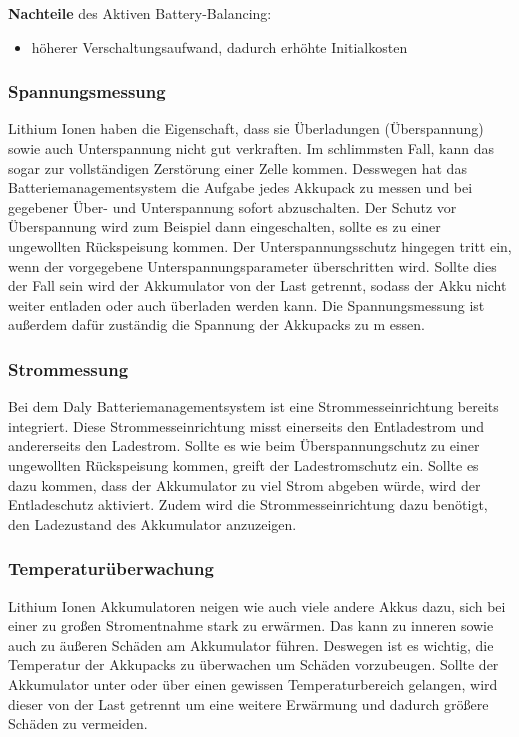 \textbf{Nachteile} des Aktiven Battery-Balancing:
\begin{itemize}
\item {höherer Verschaltungsaufwand, dadurch erhöhte Initialkosten} \medskip\\
\end{itemize}

\subsubsection{Spannungsmessung}

Lithium Ionen haben die Eigenschaft, dass sie Überladungen (Überspannung) sowie auch Unterspannung nicht gut verkraften. Im schlimmsten Fall, kann das sogar zur vollständigen Zerstörung einer Zelle kommen. Desswegen hat das Batteriemanagementsystem die Aufgabe jedes Akkupack zu messen und bei gegebener Über- und Unterspannung sofort abzuschalten. Der Schutz vor Überspannung wird zum Beispiel dann eingeschalten, sollte es zu einer ungewollten Rückspeisung kommen. Der Unterspannungsschutz hingegen tritt ein, wenn der vorgegebene Unterspannungsparameter überschritten wird. Sollte dies der Fall sein wird der Akkumulator von der Last getrennt, sodass der Akku nicht weiter entladen oder auch überladen werden kann. Die Spannungsmessung ist außerdem dafür zuständig die Spannung der Akkupacks zu m
essen.
\subsubsection{Strommessung}

Bei dem Daly Batteriemanagementsystem ist eine Strommesseinrichtung bereits integriert. Diese Strommesseinrichtung misst einerseits den Entladestrom und andererseits den Ladestrom. Sollte es wie beim Überspannungschutz zu einer ungewollten Rückspeisung kommen, greift der Ladestromschutz ein. Sollte es dazu kommen, dass der Akkumulator zu viel Strom abgeben würde, wird der Entladeschutz aktiviert. Zudem wird die Strommesseinrichtung dazu benötigt, den Ladezustand des Akkumulator anzuzeigen.

\subsubsection{Temperaturüberwachung}

Lithium Ionen Akkumulatoren neigen wie auch viele andere Akkus dazu, sich bei einer zu großen Stromentnahme stark zu erwärmen. Das kann zu inneren sowie auch zu äußeren Schäden am Akkumulator führen. Deswegen ist es wichtig, die Temperatur der Akkupacks zu überwachen um Schäden vorzubeugen. Sollte der Akkumulator unter oder über einen gewissen Temperaturbereich gelangen, wird dieser von der Last getrennt um eine weitere Erwärmung und dadurch größere Schäden zu vermeiden.
\newpage

